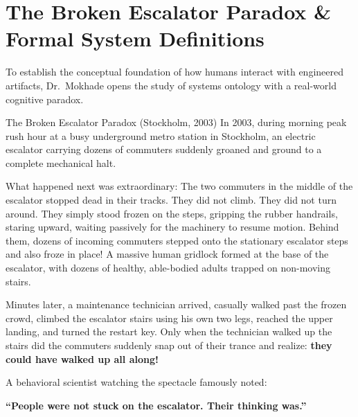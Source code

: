 \section{The Broken Escalator Paradox \& Formal System Definitions}
\label{sec:broken_escalator}

To establish the conceptual foundation of how humans interact with engineered artifacts, Dr.~Mokhade opens the study of systems ontology with a real-world cognitive paradox.

\begin{storybox}{The Broken Escalator Paradox (Stockholm, 2003)}
In 2003, during morning peak rush hour at a busy underground metro station in Stockholm, an electric escalator carrying dozens of commuters suddenly groaned and ground to a complete mechanical halt.

What happened next was extraordinary:
The two commuters in the middle of the escalator stopped dead in their tracks. They did not climb. They did not turn around. They simply stood frozen on the steps, gripping the rubber handrails, staring upward, waiting passively for the machinery to resume motion. Behind them, dozens of incoming commuters stepped onto the stationary escalator steps and also froze in place! 
A massive human gridlock formed at the base of the escalator, with dozens of healthy, able-bodied adults trapped on non-moving stairs. 

Minutes later, a maintenance technician arrived, casually walked past the frozen crowd, climbed the escalator stairs using his own two legs, reached the upper landing, and turned the restart key. Only when the technician walked up the stairs did the commuters suddenly snap out of their trance and realize: \textbf{they could have walked up all along!}

A behavioral scientist watching the spectacle famously noted:
\begin{center}
\textbf{\large ``People were not stuck on the escalator. Their thinking was.''}
\end{center}
\end{storybox}

